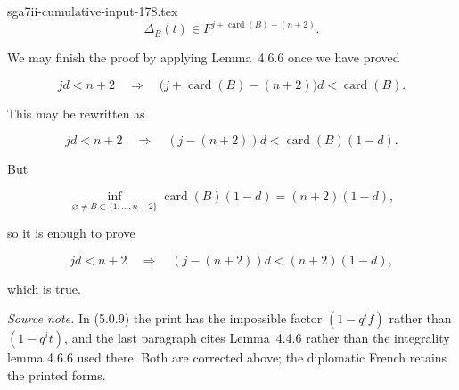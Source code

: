 \begin{filecontents*}{sga7ii-cumulative-input-178.tex}
\begin{equation}\tag{5.0.12}
\Delta_B(t)\in F^{j+\operatorname{card}(B)-(n+2)}.
\end{equation}

We may finish the proof by applying Lemma~4.6.6 once we have proved

\begin{equation}\tag{5.0.13}
jd<n+2
\quad\Longrightarrow\quad
\bigl(j+\operatorname{card}(B)-(n+2)\bigr)d
<\operatorname{card}(B).
\end{equation}

This may be rewritten as

\begin{equation}\tag{5.0.14}
jd<n+2
\quad\Longrightarrow\quad
(j-(n+2))d<\operatorname{card}(B)(1-d).
\end{equation}

But

\[
\inf_{\varnothing\ne B\subset\{1,\ldots,n+2\}}
\operatorname{card}(B)(1-d)
=(n+2)(1-d),
\]

so it is enough to prove

\begin{equation}\tag{5.0.15}
jd<n+2
\quad\Longrightarrow\quad
(j-(n+2))d<(n+2)(1-d),
\end{equation}

which is true.

\medskip
\noindent\emph{Source note.}
In (5.0.9) the print has the impossible factor $(1-q^if)$ rather than
$(1-q^it)$, and the last paragraph cites Lemma~4.4.6 rather than the
integrality lemma 4.6.6 used there.  Both are corrected above; the diplomatic
French retains the printed forms.

\end{filecontents*}
